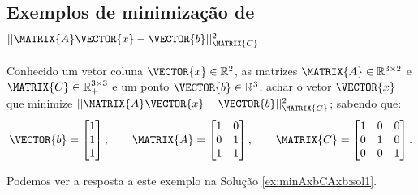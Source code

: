 \subsection{Exemplos de minimização de $||\MATRIX{A}\VECTOR{x}-\VECTOR{b}||_{\MATRIX{C}}^2$}

\begin{example}
\label{ex:minAxbCAxb1}
Conhecido 
um vetor coluna $\VECTOR{x}\in \mathbb{R}^2$,
as matrizes $\MATRIX{A} \in \mathbb{R}^{3\times 2}$ e $\MATRIX{C} \in \mathbb{R}^{3\times 3}_{+}$
e um ponto $\VECTOR{b} \in \mathbb{R}^{3}$,
achar o vetor $\VECTOR{x}$ que minimize $||\MATRIX{A}\VECTOR{x}-\VECTOR{b}||_{\MATRIX{C}}^2$;
sabendo que:
\begin{equation}
\VECTOR{b}=\begin{bmatrix}
1\\
1\\
1
\end{bmatrix},
\qquad 
\MATRIX{A}=\begin{bmatrix}
1 & 0\\
0 & 1\\
1 & 1
\end{bmatrix},
\qquad 
\MATRIX{C}=\begin{bmatrix}
1 & 0 & 0\\
0 & 1 & 0\\
0 & 0 & 1
\end{bmatrix}.
\end{equation}

Podemos ver a resposta a este exemplo na Solução \ref{ex:minAxbCAxb:sol1}.
\end{example}


